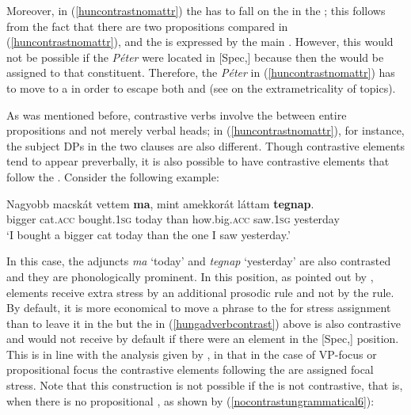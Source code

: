 Moreover, in (\ref{huncontrastnomattr}) the  has to fall on the  in the ; this follows from the fact that there are two propositions compared in (\ref{huncontrastnomattr}), and the  is expressed by the main . However, this would not be possible if the  \textit{Péter} were located in [Spec,] because then the  would be assigned to that constituent. Therefore, the  \textit{Péter} in (\ref{huncontrastnomattr}) has to move to a  in order to escape both  and  (see \citealt{szendroi2001diss} on the extrametricality of topics).

As was mentioned before, contrastive verbs involve the  between entire propositions and not merely verbal heads; in (\ref{huncontrastnomattr}), for instance, the subject DPs in the two clauses are also different. Though contrastive elements tend to appear preverbally, it is also possible to have contrastive elements that follow the . Consider the following example:

\ea \gll	Nagyobb	macskát	vettem	\textbf{ma},	mint	amekkorát	láttam \textbf{tegnap}. \label{hungadverbcontrast}\\
bigger	cat.\textsc{acc}	bought.\textsc{1sg}	today	than	how.big.\textsc{acc}	saw.\textsc{1sg} yesterday\\
\glt `I bought a bigger cat today than the one I saw yesterday.'
\z
	
In this case, the adjuncts \textit{ma} `today' and \textit{tegnap} `yesterday' are also contrasted and they are phonologically prominent. In this position, as pointed out by \citet[53--55]{szendroi2001diss}, elements receive extra stress by an additional prosodic rule and not by the  rule. By default, it is more economical to move a phrase to the  for stress assignment than to leave it in the  but the  in (\ref{hungadverbcontrast}) above is also contrastive and would not receive  by default if there were an element in the [Spec,] position. This is in line with the analysis given by \citet{kenesei2006}, in that in the case of VP-focus or propositional focus the contrastive elements following the  are assigned focal stress. Note that this construction is not possible if the  is not contrastive, that is, when there is no propositional , as shown by (\ref{nocontrastungrammatical6}):

